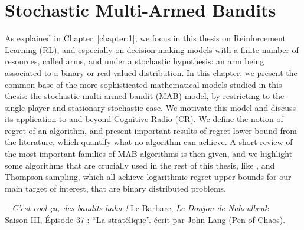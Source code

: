 
\chapter{Stochastic Multi-Armed Bandits}
\label{chapter:2}

\graphicspath{{2-Chapters/2-Chapter/Images/}}


\abstractStartChapter{}%
%
As explained in Chapter~\ref{chapter:1}, we focus in this thesis on Reinforcement Learning (RL), and especially on decision-making models with a finite number of resources, called arms, and under a stochastic hypothesis: an arm being associated to a binary or real-valued distribution.
In this chapter, we present the common base of the more sophisticated mathematical models studied in this thesis: the stochastic multi-armed bandit (MAB) model, by restricting to the single-player and stationary stochastic case.
%
We motivate this model and discuss its application to and beyond Cognitive Radio (CR).
%
We define the notion of regret of an algorithm, and present important results of regret lower-bound from the literature, which quantify what no algorithm can achieve.
A short review of the most important families of MAB algorithms is then given,
and we highlight some algorithms that are crucially used in the rest of this thesis, like \UCB, \klUCB{} and Thompson sampling, which all achieve logarithmic regret upper-bounds for our main target of interest, that are binary distributed problems.
%


\begin{small}
    \begin{flushright}
        \emph{-- C'est cool ça, des bandits haha !} Le Barbare,
        \emph{Le Donjon de Naheulbeuk}\\
        Saison III, \href{https://soundcloud.com/penofchaos/naheulbeuk-saison-3-episode-5?in=penofchaos/sets/naheulbeuk-saison-3#t=2:05}{Épisode 37 : ``La stratélique''}.
        écrit par John Lang (Pen of Chaos).
    \end{flushright}
\end{small}


